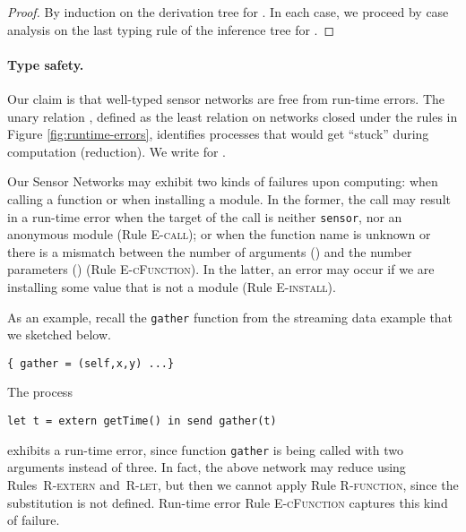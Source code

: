 \documentclass[copyright,creativecommons]{eptcs}
\newcommand{\mkRrule}[1]{{\footnotesize \textsc{R-#1}}}
\newcommand{\mkErule}[1]{{\footnotesize \textsc{E-#1}}}
\newcommand{\Rfunction}{\mkRrule{function}}
\newcommand{\Rlet}{\mkRrule{let}}
\newcommand{\Rsystem}{\mkRrule{extern}}
\newcommand{\Efunction}{\mkErule{cFunction}}
\newcommand{\Ecall}{\mkErule{call}}
\newcommand{\Einstall}{\mkErule{install}}
\begin{document}
\begin{proof}
  By induction on the derivation tree for . 
In each case, we proceed by case analysis on the last typing rule of
  the inference tree for .
\end{proof}


\paragraph{Type safety.}
\label{sec:type-safety}
Our claim is that well-typed sensor networks are free from run-time errors.
The unary relation , defined as the least relation on
networks closed under the rules in Figure
\ref{fig:runtime-errors}, identifies processes that would get ``stuck''
during computation (reduction).
We write  for .

Our Sensor Networks may exhibit two kinds of failures upon
computing: when calling a function or when installing a module.
In the former, the call may result in a run-time error when the target
of the call is neither \lstinline{sensor}, nor an anonymous module (Rule
\Ecall);
or when the function name is unknown or there is a mismatch
between the number of arguments () and the number
parameters () (Rule \Efunction).
In the latter, an error may occur if we are installing some value
that is not a module (Rule \Einstall).

As an example, recall the \lstinline{gather} function from the
streaming data example that we sketched below.
\begin{lstlisting}[frame=none]
  { gather = (self,x,y) ...}
\end{lstlisting}
The process
\begin{lstlisting}[frame=none]
  let t = extern getTime() in send gather(t)
\end{lstlisting}
exhibits a run-time error, since function
\lstinline|gather| is being called with two arguments instead of three.
In fact, the above network may reduce using Rules~\Rsystem{} and~\Rlet, but
then we cannot apply Rule \Rfunction, since the substitution is not
defined.
Run-time error Rule \Efunction{} captures this kind of failure.
\end{document}
